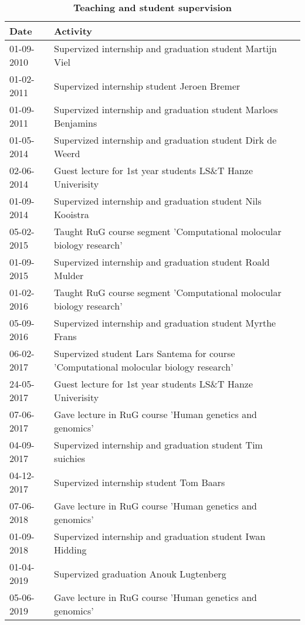 \begin{appendices}
	\begin{table}
		\caption*{\textbf{Teaching and student supervision}}
		\footnotesize
		\begin{tabulary}{\linewidth}{LL}
			Date & Activity \\
			\hline		
			\rule{0pt}{2.5ex}\mbox{01-09-2010} & Supervized internship and graduation student Martijn Viel\\
			\rule{0pt}{2.5ex}\mbox{01-02-2011} & Supervized internship student Jeroen Bremer \\
			\rule{0pt}{2.5ex}\mbox{01-09-2011} & Supervized internship and graduation student Marloes Benjamins \\
			\rule{0pt}{2.5ex}\mbox{01-05-2014} & Supervized internship and graduation student Dirk de Weerd \\
			\rule{0pt}{2.5ex}\mbox{02-06-2014} & Guest lecture for 1st year students LS\&T Hanze Univerisity \\
			\rule{0pt}{2.5ex}\mbox{01-09-2014} & Supervized internship and graduation student Nils Kooistra \\
			\rule{0pt}{2.5ex}\mbox{05-02-2015} & Taught RuG course segment 'Computational molocular biology research'\\
			\rule{0pt}{2.5ex}\mbox{01-09-2015} & Supervized internship and graduation student Roald Mulder \\
			\rule{0pt}{2.5ex}\mbox{01-02-2016} & Taught RuG course segment 'Computational molocular biology research' \\
			\rule{0pt}{2.5ex}\mbox{05-09-2016} & Supervized internship and graduation student Myrthe Frans\\
			\rule{0pt}{2.5ex}\mbox{06-02-2017} & Supervized student Lars Santema for course 'Computational molocular biology research' \\
			\rule{0pt}{2.5ex}\mbox{24-05-2017} & Guest lecture for 1st year students LS\&T Hanze Univerisity \\
			\rule{0pt}{2.5ex}\mbox{07-06-2017} & Gave lecture in RuG course 'Human genetics and genomics' \\
			\rule{0pt}{2.5ex}\mbox{04-09-2017} & Supervized internship and graduation student Tim suichies \\
			\rule{0pt}{2.5ex}\mbox{04-12-2017} & Supervized internship student Tom Baars\\
			\rule{0pt}{2.5ex}\mbox{07-06-2018} & Gave lecture in RuG course 'Human genetics and genomics' \\
			\rule{0pt}{2.5ex}\mbox{01-09-2018} & Supervized internship and graduation student Iwan Hidding\\
			\rule{0pt}{2.5ex}\mbox{01-04-2019} & Supervized graduation Anouk Lugtenberg \\
			\rule{0pt}{2.5ex}\mbox{05-06-2019} & Gave lecture in RuG course 'Human genetics and genomics' \\
			\hline
		\end{tabulary}
		\label{table:appendix_activities_4}
	\end{table}
	

\end{appendices}
